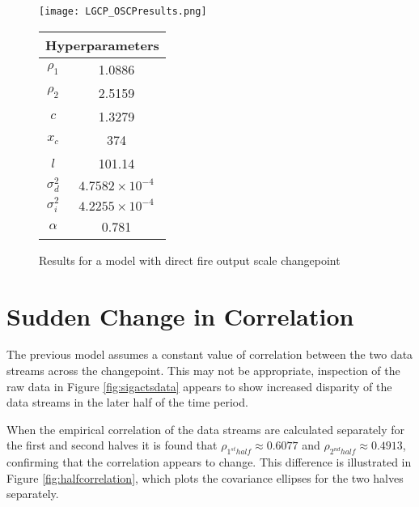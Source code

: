 \documentclass[a4paper,11pt]{report}
\begin{document}
  \begin{figure}[!ht]
    \centering
    \texttt{[image: LGCP\_OSCPresults.png]}
    \qquad
    \doublespacing
    \begin{tabular}[b]{cc}
    \multicolumn{2}{c}{\textbf{Hyperparameters}}                                            \\ \hline
      \(\rho_1\)                    & 1.0886                \\                       
\(\rho_2\)                     & 2.5159                           \\            
\(c\)                               & 1.3279                                      \\ 
\(x_c\)                        & 374                                         \\ 
\(l\)                               & 101.14                                      \\  
\(\sigma_d^2\) & \(4.7582 \times 10^{-4}\) \\ 
\(\sigma_i^2\) & \(4.2255 \times 10^{-4}\) \\ 
\(\alpha\)                      & 0.781              \\                      
    \end{tabular}
    \captionsetup{labelformat=andtable}
    \caption{Results for a model with direct fire output scale changepoint}
  \end{figure}

\section{Sudden Change in Correlation}

The previous model assumes a constant value of correlation between the two data streams across the changepoint. This may not be appropriate, inspection of the raw data in Figure \ref{fig:sigactsdata} appears to show increased disparity of the data streams in the later half of the time period. 

When the empirical correlation of the data streams are calculated separately for the first and second halves it is found that \(\rho_{1^{st} half} \approx 0.6077 \) and \(\rho_{2^{nd} half} \approx 0.4913\), confirming that the correlation appears to change. This difference is illustrated in Figure \ref{fig:halfcorrelation}, which plots the covariance ellipses for the two halves separately.  \par
 
\end{document}
